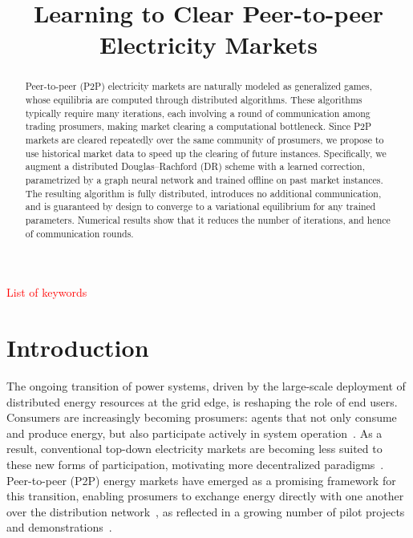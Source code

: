 \documentclass[final]{l4dc2026}
\title[Learning to Clear Peer-to-peer Electricity Markets]{Learning to Clear Peer-to-peer Electricity Markets}
\begin{document}
\maketitle

\begin{abstract}%
Peer-to-peer (P2P) electricity markets are naturally modeled as generalized games, whose equilibria are computed through distributed algorithms. These algorithms typically require many iterations, each involving a round of communication among trading prosumers, making market clearing a computational bottleneck.
Since P2P markets are cleared repeatedly over the same community of prosumers, we propose to use historical market data to speed up the clearing of future instances. Specifically, we augment a distributed Douglas--Rachford (DR) scheme with a learned correction, parametrized by a graph neural network and trained offline on past market instances. The resulting algorithm is fully distributed, introduces no additional communication, and is guaranteed by design to converge to a variational equilibrium for any trained parameters. Numerical results show that it reduces the number of iterations, and hence of communication rounds.
\end{abstract}

\begin{keywords}%
  \textcolor{red}{List of keywords}%
\end{keywords}



\section{Introduction}
The ongoing transition of power systems, driven by the large-scale deployment of distributed energy resources at the grid edge, is reshaping the role of end users. Consumers are increasingly becoming prosumers: agents that not only consume and produce energy, but also participate actively in system operation~\citep{parag2016electricity, tushar2020peer}. As a result, conventional top-down electricity markets are becoming less suited to these new forms of participation, motivating more decentralized paradigms~\citep{pinson2023may}. Peer-to-peer (P2P) energy markets have emerged as a promising framework for this transition, enabling prosumers to exchange energy directly with one another over the distribution network~\citep{liu2019peer}, as reflected in a growing number of pilot projects and demonstrations~\citep{zhang2017review, ableitner2019quartierstrom, mengelkamp2018designing}.
\end{document}
